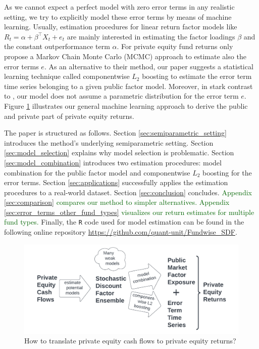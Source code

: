 \documentclass[12pt]{article}
\begin{document}
As we cannot expect a perfect model with zero error terms in any realistic setting, we try to explicitly model these error terms by means of machine learning.
Usually, estimation procedures for linear return factor models like $R_t= \alpha + \beta^{\top} X_t + e_t$ are mainly interested in estimating the factor loadings $\beta$ and the constant outperformance term $\alpha$.
For private equity fund returns only \cite{ACGP18} propose a Markov Chain Monte Carlo (MCMC) approach to estimate also the error terms $e$.
As an alternative to their method, our paper suggests a statistical learning technique called componentwise $L_2$ boosting to estimate the error term time series belonging to a given public factor model.
Moreover, in stark contrast to \cite{ACGP18}, our model does not assume a parametric distribution for the error term $e$.
Figure \ref{fig:how} illustrates our general machine learning approach to derive the public and private part of private equity returns.

The paper is structured as follows.
Section \ref{sec:semiparametric_setting} introduces the method's underlying semiparametric setting.
Section \ref{sec:model_selection} explains why model selection is problematic.
Section \ref{sec:model_combination} introduces two estimation procedures: model combination for the public factor model and componentwise $L_2$ boosting for the error terms.
Section \ref{sec:applications} successfully applies the estimation procedures to a real-world dataset.
Section \ref{sec:conclusion} concludes.
\textcolor{darkgreen}{
Appendix \ref{sec:comparison} compares our method to simpler alternatives. 
Appendix \ref{sec:error_terms_other_fund_types} visualizes our return estimates for multiple fund types.
}
Finally, the \texttt{R} code used for model estimation can be found in the following online repository \url{https://github.com/quant-unit/Fundwise_SDF}.

\begin{figure}[ht]
	\centering
	\includegraphics[width=14cm]{FlowChart/MLPER}
	\caption{How to translate private equity cash flows to private equity returns?}
	\label{fig:how}
\end{figure}
\end{document}
